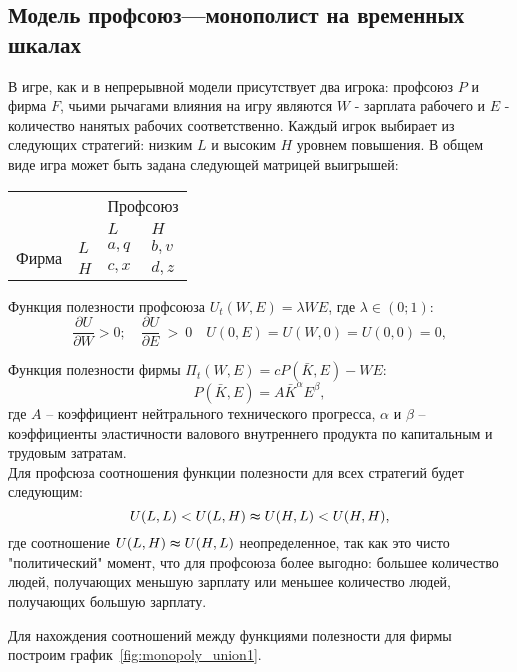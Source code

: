 \subsection{Модель профсоюз---монополист на временных шкалах}

В игре, как и в непрерывной модели присутствует два игрока: профсоюз $P$ и фирма $F$, чьими рычагами влияния на игру являются $W$ - зарплата рабочего и $E$ - количество нанятых рабочих соответственно.
Каждый игрок выбирает из следующих стратегий: низким $L$ и высоким $H$ уровнем повышения. В общем виде игра может быть задана следующей матрицей выигрышей: 

\begin{table}[h]
	\centering
	\begin{tabular}{|l|l|l|l|}
		\hline
		\multicolumn{2}{|l|}{\multirow{2}{*}{}} & \multicolumn{2}{l|}{Профсоюз} \\ \cline{3-4} 
		\multicolumn{2}{|l|}{}                  & $L$            & $H$            \\ \hline
		\multirow{2}{*}{Фирма}     & $L$     & $a,q$          & $b,v$          \\ \cline{2-4} 
		& $H$     & $c,x$          & $d,z$          \\ \hline
	\end{tabular}
\end{table}
Функция полезности профсоюза  $U_t(W,E)=\lambda WE$, где $\lambda \in(0;1)$:
$$\frac{\partial U}{\partial W} > 0; \quad \frac{\partial U}{\partial E}~>~0 \quad U(0,E)=U(W,0)=U(0,0)=0,$$


Функция полезности фирмы $\Pi_t(W,E)=cP(\bar{K},E)-WE$:
$$P(\bar{K}, E)=A\bar{K}^\alpha E^\beta,$$ где $A$ – коэффициент нейтрального технического прогресса, $\alpha$ и $\beta$ – коэффициенты эластичности валового внутреннего продукта по капитальным и трудовым затратам.\\

Для профсюза соотношения функции полезности для всех стратегий будет следующим:
\begin{equation}
U(L,L) < U(L,H) \thickapprox U(H, L) < U(H,H),
\end{equation}
где соотношение $U(L,H) \thickapprox U(H, L)$ неопределенное, так как это чисто "политический" момент, что для профсоюза более выгодно: большее количество людей, получающих меньшую зарплату или меньшее количество людей, получающих большую зарплату. 

Для нахождения соотношений между функциями полезности для фирмы построим график~\ref{fig:monopoly_union1}.

